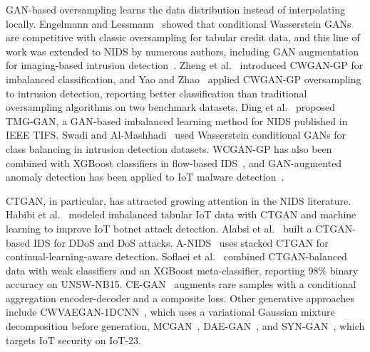 ﻿\documentclass[journal]{IEEEtran}
\begin{document}
GAN-based oversampling learns the data distribution instead of interpolating locally. Engelmann and Lessmann~\cite{engelmann2021cwgan} showed that conditional Wasserstein GANs are competitive with classic oversampling for tabular credit data, and this line of work was extended to NIDS by numerous authors, including GAN augmentation for imaging-based intrusion detection~\cite{andresini2021ganaug}. Zheng et al.~\cite{zheng2020cwgangp} introduced CWGAN-GP for imbalanced classification, and Yao and Zhao~\cite{yao2025cwgangp} applied CWGAN-GP oversampling to intrusion detection, reporting better classification than traditional oversampling algorithms on two benchmark datasets. Ding et al.~\cite{ding2024tmgggan} proposed TMG-GAN, a GAN-based imbalanced learning method for NIDS published in IEEE TIFS. Swadi and Al-Mashhadi~\cite{swadi2025wcg} used Wasserstein conditional GANs for class balancing in intrusion detection datasets. WCGAN-GP has also been combined with XGBoost classifiers in flow-based IDS~\cite{vo2024apelid}, and GAN-augmented anomaly detection has been applied to IoT malware detection~\cite{moti2021ganiot}.

CTGAN, in particular, has attracted growing attention in the NIDS literature. Habibi et al.~\cite{habibi2023ctgan} modeled imbalanced tabular IoT data with CTGAN and machine learning to improve IoT botnet attack detection. Alabsi et al.~\cite{alabsi2023ctgan} built a CTGAN-based IDS for DDoS and DoS attacks. A-NIDS~\cite{zha2025anids} uses stacked CTGAN for continual-learning-aware detection. Soflaei et al.~\cite{soflaei2024dualctgan} combined CTGAN-balanced data with weak classifiers and an XGBoost meta-classifier, reporting 98\% binary accuracy on UNSW-NB15. CE-GAN~\cite{yang2025cegan} augments rare samples with a conditional aggregation encoder-decoder and a composite loss. Other generative approaches include CWVAEGAN-1DCNN~\cite{he2023cwvaegan}, which uses a variational Gaussian mixture decomposition before generation, MCGAN~\cite{babu2023mcgan}, DAE-GAN~\cite{li2022daegan}, and SYN-GAN~\cite{rahman2024syngan}, which targets IoT security on IoT-23.
\end{document}

